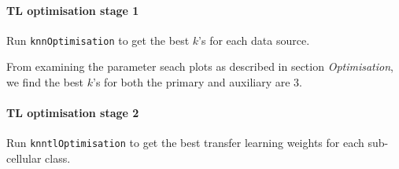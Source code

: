 \paragraph{TL optimisation stage 1} Run \texttt{knnOptimisation} to get
the best $k$'s for each data source.

\begin{knitrout}
\color{fgcolor}\begin{kframe}
\begin{alltt}
 \hlkwb{<-}   \hlstd{=} \hlstd{)}
 \hlkwb{<-}   \hlstd{=} \hlstd{)}
\end{alltt}
\end{kframe}
\end{knitrout}

From examining the parameter seach plots as described in section
\textit{Optimisation}, we find the best $k$'s for both the primary and
auxiliary are 3.

\paragraph{TL optimisation stage 2} Run \texttt{knntlOptimisation} to
get the best transfer learning weights for each sub-cellular class.

\begin{knitrout}
\color{fgcolor}\begin{kframe}
\begin{alltt}
 \hlkwb{<-} \hlstd{(}\hlstd{,}  \hlstd{=} \hlstd{)}

 \hlkwb{<-}   \hlstd{=} \hlstd{,}
                            \hlstd{=} \hlstd{,}  \hlstd{=} \hlstd{,}
                            \hlstd{=} \hlstd{,}  \hlstd{=} \hlstd{(}\hlstd{,} \hlstd{),}
                            
\end{alltt}
\end{kframe}
\end{knitrout}


